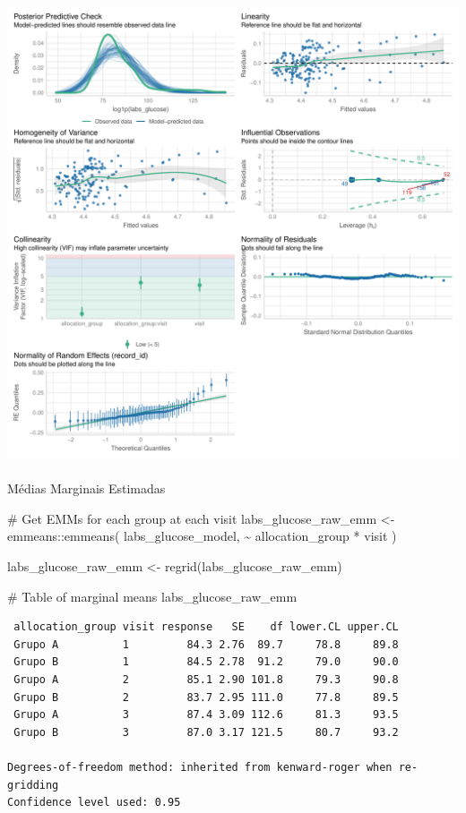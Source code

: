 \documentclass[
  letterpaper,
  DIV=11,
  numbers=noendperiod]{scrartcl}
\makeatletter
\let\oldparagraph\paragraph
\renewcommand{\paragraph}{
    \@ifstar
      \xxxParagraphStar
      \xxxParagraphNoStar
  }
\newcommand{\xxxParagraphStar}[1]{\oldparagraph*{#1}\mbox{}}
\newcommand{\xxxParagraphNoStar}[1]{\oldparagraph{#1}\mbox{}}
\newenvironment{Shaded}{\begin{snugshade}}{\end{snugshade}}
\newcommand{\CommentTok}[1]{\textcolor[rgb]{0.37,0.37,0.37}{#1}}
\newcommand{\FunctionTok}[1]{\textcolor[rgb]{0.28,0.35,0.67}{#1}}
\newcommand{\NormalTok}[1]{\textcolor[rgb]{0.00,0.23,0.31}{#1}}
\newcommand{\OtherTok}[1]{\textcolor[rgb]{0.00,0.23,0.31}{#1}}
\newcommand{\SpecialCharTok}[1]{\textcolor[rgb]{0.37,0.37,0.37}{#1}}
\makeatother
\begin{document}
\includegraphics{Outcomes_V1V2V3_files/figure-pdf/labs_glucose_4-2.pdf}

\paragraph{Médias Marginais
Estimadas}\label{muxe9dias-marginais-estimadas-8}

\begin{Shaded}
\begin{Highlighting}[]
\CommentTok{\# Get EMMs for each group at each visit}
\NormalTok{labs\_glucose\_raw\_emm }\OtherTok{\textless{}{-}}\NormalTok{ emmeans}\SpecialCharTok{::}\FunctionTok{emmeans}\NormalTok{(}
\NormalTok{    labs\_glucose\_model, }
    \SpecialCharTok{\textasciitilde{}}\NormalTok{ allocation\_group }\SpecialCharTok{*}\NormalTok{ visit}
\NormalTok{)}

\NormalTok{labs\_glucose\_raw\_emm }\OtherTok{\textless{}{-}} \FunctionTok{regrid}\NormalTok{(labs\_glucose\_raw\_emm)}

\CommentTok{\# Table of marginal means}
\NormalTok{labs\_glucose\_raw\_emm}
\end{Highlighting}
\end{Shaded}

\begin{verbatim}
 allocation_group visit response   SE    df lower.CL upper.CL
 Grupo A          1         84.3 2.76  89.7     78.8     89.8
 Grupo B          1         84.5 2.78  91.2     79.0     90.0
 Grupo A          2         85.1 2.90 101.8     79.3     90.8
 Grupo B          2         83.7 2.95 111.0     77.8     89.5
 Grupo A          3         87.4 3.09 112.6     81.3     93.5
 Grupo B          3         87.0 3.17 121.5     80.7     93.2

Degrees-of-freedom method: inherited from kenward-roger when re-gridding 
Confidence level used: 0.95 
\end{verbatim}
\end{document}
